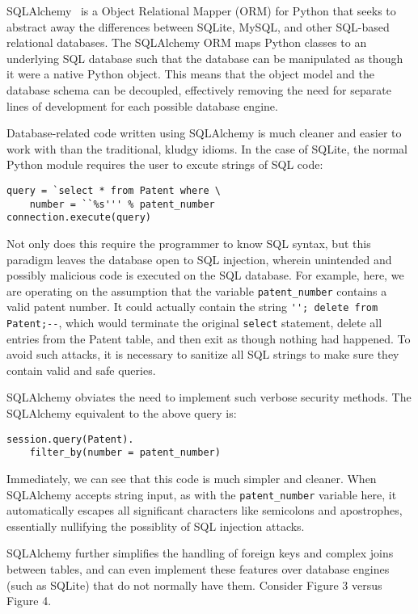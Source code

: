 SQLAlchemy~\cite{sqlalchemy} is a Object Relational Mapper (ORM)
for Python that seeks to abstract away the differences between SQLite,
MySQL, and other SQL-based relational databases. The SQLAlchemy ORM
maps Python classes to an underlying SQL database such that the database
can be manipulated as though it were a native Python object. This
means that the object model and the database schema can be decoupled,
effectively removing the need for separate lines of development for
each possible database engine.

Database-related code written using SQLAlchemy is much cleaner and
easier to work with than the traditional, kludgy idioms. In the case
of SQLite, the normal Python module requires the user to excute strings
of SQL code: 
\begin{lstlisting}
query = `select * from Patent where \
    number = ``%s''' % patent_number
connection.execute(query)
\end{lstlisting}


Not only does this require the programmer to know SQL syntax, but
this paradigm leaves the database open to SQL injection, wherein unintended
and possibly malicious code is executed on the SQL database. For example,
here, we are operating on the assumption that the variable \verb`patent_number`
contains a valid patent number. It could actually contain the string
\verb`''; delete from Patent;--`, which would terminate the original
\verb`select` statement, delete all entries from the Patent table,
and then exit as though nothing had happened. To avoid such attacks,
it is necessary to sanitize all SQL strings to make sure they contain
valid and safe queries.

SQLAlchemy obviates the need to implement such verbose security methods.
The SQLAlchemy equivalent to the above query is:

\begin{lstlisting}
session.query(Patent).
    filter_by(number = patent_number)
\end{lstlisting}


Immediately, we can see that this code is much simpler and cleaner.
When SQLAlchemy accepts string input, as with the \verb`patent_number`
variable here, it automatically escapes all significant characters
like semicolons and apostrophes, essentially nullifying the possiblity
of SQL injection attacks.

SQLAlchemy further simplifies the handling of foreign keys and complex
joins between tables, and can even implement these features over database
engines (such as SQLite) that do not normally have them. Consider
Figure 3 versus Figure 4.


